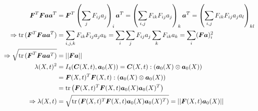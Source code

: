 \begin{align*}
	\vF^T\vF\va\va^T &= \vF^T\left(\sum_j F_{ij}a_j\right)_i\va^T = \left(\sum_{i,j} F_{ik}F_{ij}a_j\right)_k\va^T
		= \left(\sum_{i,j} F_{ik}F_{ij}a_ja_l\right)_{kl}\\
	\Rightarrow \tr{(\vF^T\vF\va\va^T)} &= \sum_{i,j,k} F_{ik}F_{ij}a_ja_k = \sum_i \sum_jF_{ij}a_j \sum_k F_{ik}a_k = \sum_i (\vF\va)_i^2\\
	\Rightarrow \sqrt{\tr{(\vF^T\vF\va\va^T)}} &= \no{\vF\va}\\
	\la(X,t)^2 &=I_4(\vC(X,t),\va_0(X)) = \vC(X,t):(\va_0(X)\otimes \va_0(X))\\
			&=  \vF(X,t)^T\vF(X,t) : (\va_0(X)\otimes \va_0(X))\\
			&= \tr{\left(\vF(X,t)^T\vF(X,t)\va_0(X)\va_0(X)^T\right)}\\
	\Rightarrow \la(X,t) &=
			\sqrt{\tr{\left(\vF(X,t)^T\vF(X,t)\va_0(X)\va_0(X)^T\right)}} = \no{\vF(X,t)\va_0(X)} 
\end{align*}

